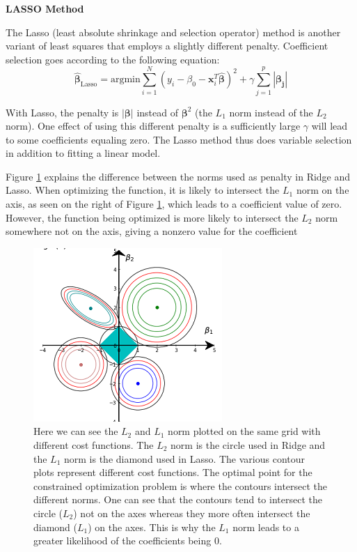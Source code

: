 \documentclass[12pt]{article}
\begin{document}
\textbf{LASSO Method}


The Lasso (least absolute shrinkage and selection operator) method is another variant of least squares that employs a slightly different penalty. Coefficient selection goes according to the following equation:
$$\boldsymbol{\hat{\beta}}_{\text{Lasso}} = \text{argmin} \sum_{i=1}^{N} (y_i - \beta_0 - \textbf{x}_i^T \boldsymbol{\hat{\beta}})^2 + \gamma \sum_{j=1}^{p}|\boldsymbol{\beta_j}|$$

With Lasso, the penalty is $|\boldsymbol{\beta}|$ instead of $\boldsymbol{\beta}^2$ (the $L_1$ norm instead of the $L_2$ norm). One effect of using this different penalty is a sufficiently large $\gamma$ will lead to some coefficients equaling zero. The Lasso method thus does variable selection in addition to fitting a linear model. \cite[64]{springer}

Figure \ref{l2l1} explains the difference between the norms used as penalty in Ridge and Lasso. When optimizing the function, it is likely to intersect the $L_1$ norm on the axis, as seen on the right of Figure \ref{l2l1}, which leads to a coefficient value of zero. However, the function being optimized is more likely to intersect the $L_2$ norm somewhere not on the axis, giving a nonzero value for the coefficient

\begin{figure}
	\centering
	\includegraphics[width=.5\linewidth]{l1l2.png}
	\caption{Here we can see the $L_2$ and $L_1$ norm plotted on the same grid with different cost functions. The $L_2$ norm is the circle used in Ridge and the $L_1$ norm is the diamond used in Lasso. The various contour plots represent different cost functions. The optimal point for the constrained optimization problem is where the contours intersect the different norms. One can see that the contours tend to intersect the circle ($L_2$) not on the axes whereas they more often intersect the diamond ($L_1$) on the axes. This is why the $L_1$ norm leads to a greater likelihood of the coefficients being 0.}
	\label{l2l1}
\end{figure}
\end{document}
